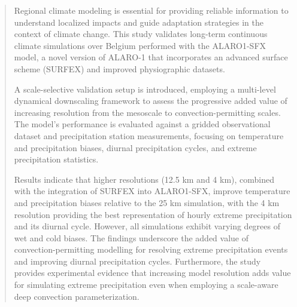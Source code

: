 \documentclass[journal abbreviation, manuscript]{copernicus}
\begin{document}
\begin{abstract}
Regional climate modeling is essential for providing reliable information to understand localized impacts and guide adaptation strategies in the context of climate change. This study validates long-term continuous climate simulations over Belgium performed with the ALARO1-SFX model, a novel version of ALARO-1 that incorporates an advanced surface scheme (SURFEX) and improved physiographic datasets.

A scale-selective validation setup is introduced, employing a multi-level dynamical downscaling framework to assess the progressive added value of increasing resolution from the mesoscale to convection-permitting scales. The model's performance is evaluated against a gridded observational dataset and precipitation station measurements, focusing on temperature and precipitation biases, diurnal precipitation cycles, and extreme precipitation statistics.

Results indicate that higher resolutions (12.5 km and 4 km), combined with the integration of SURFEX into ALARO1-SFX, improve temperature and precipitation biases relative to the 25 km simulation, with the 4 km resolution providing the best representation of hourly extreme precipitation and its diurnal cycle. However, all simulations exhibit varying degrees of wet and cold biases. The findings underscore the added value of convection-permitting modelling for resolving extreme precipitation events and improving diurnal precipitation cycles. Furthermore, the study provides experimental evidence that increasing model resolution adds value for simulating extreme precipitation even when employing a scale-aware deep convection parameterization.
\end{abstract}




\introduction  %
\end{document}

